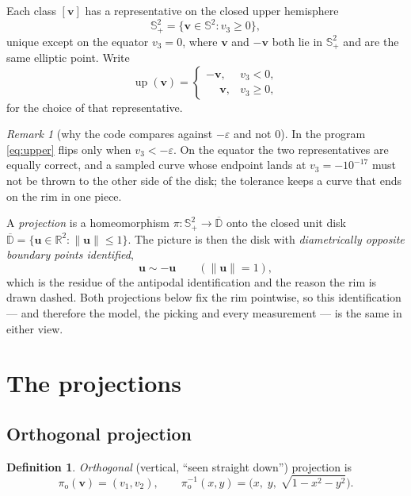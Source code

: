 \documentclass[11pt,a4paper]{article}
\newcommand{\R}{\mathbb{R}}
\newcommand{\Sph}{\mathbb{S}^2}
\newcommand{\D}{\mathbb{D}}
\newcommand{\Hemi}{\mathbb{S}^{2}_{+}}
\newcommand{\proj}[1]{\pi_{\mathrm{#1}}}
\newcommand{\po}{\proj{o}}
\newcommand{\vv}{\mathbf{v}}
\newcommand{\uu}{\mathbf{u}}
\newcommand{\norm}[1]{\lVert #1 \rVert}
\theoremstyle{plain}
\theoremstyle{definition}
\newtheorem{definition}[proposition]{Definition}
\theoremstyle{remark}
\newtheorem{remark}[proposition]{Remark}
\begin{document}
Each class $[\vv]$ has a representative on the closed upper hemisphere
\[
  \Hemi=\{\vv\in\Sph : v_3\ge 0\},
\]
unique except on the equator $v_3=0$, where $\vv$ and $-\vv$ both lie in
$\Hemi$ and are the same elliptic point. Write
\begin{equation}
  \label{eq:upper}
  \operatorname{up}(\vv)=
  \begin{cases}
    -\vv, & v_3<0,\\
    \phantom{-}\vv, & v_3\ge 0,
  \end{cases}
\end{equation}
for the choice of that representative.

\begin{remark}[why the code compares against $-\varepsilon$ and not $0$]
In the program \eqref{eq:upper} flips only when $v_3<-\varepsilon$. On the
equator the two representatives are equally correct, and a sampled curve whose
endpoint lands at $v_3=-10^{-17}$ must not be thrown to the other side of the
disk; the tolerance keeps a curve that ends on the rim in one piece.
\end{remark}

A \emph{projection} is a homeomorphism $\pi\colon\Hemi\to\overline{\D}$ onto the
closed unit disk $\overline{\D}=\{\uu\in\R^2:\norm{\uu}\le 1\}$. The picture is
then the disk with \emph{diametrically opposite boundary points identified},
\[
  \uu \sim -\uu \qquad (\norm{\uu}=1),
\]
which is the residue of the antipodal identification and the reason the rim is
drawn dashed. Both projections below fix the rim pointwise, so this
identification --- and therefore the model, the picking and every measurement
--- is the same in either view.

\section{The projections}
\label{sec:projections}

\subsection{Orthogonal projection}

\begin{definition}
\emph{Orthogonal} (vertical, ``seen straight down'') projection is
\begin{equation}
  \label{eq:ortho}
  \po(\vv)=(v_1,v_2),
  \qquad
  \po^{-1}(x,y)=\bigl(x,\;y,\;\sqrt{1-x^2-y^2}\bigr).
\end{equation}
\end{definition}
\end{document}
